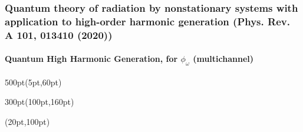 \begin{frame}

\frametitle{Quantum theory of radiation by nonstationary systems 
        with application to high-order harmonic generation
        (Phys. Rev. A 101, 013410 (2020))}
        \framesubtitle{Quantum High Harmonic Generation, 
	for $\phi_\omega$ (multichannel)}
\small
\begin{textblock*}{500pt}(5pt,60pt)
 \begin{minipage}{0.0\linewidth}
 \begin{figure}[tp]
 \end{figure}

\end{minipage}
\end{textblock*}

\begin{textblock*}{300pt}(100pt,160pt)
\end{textblock*}


\begin{textblock*}{\linewidth}(20pt,100pt)
\end{textblock*}
%
%
%
%

\end{frame}







